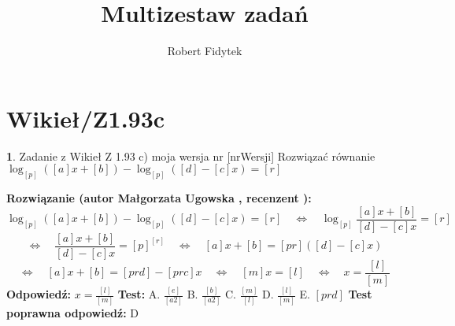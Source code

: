 \documentclass[12pt, a4paper]{article}
\title{Multizestaw zadań}
\author{Robert Fidytek}
\date{}
\theoremstyle{definition} %
\newtheorem{zad}{}
\newcommand{\kategoria}[1]{\section{#1}} %
\newcommand{\zadStart}[1]{\begin{zad}#1\newline} %
\newcommand{\zadStop}{\end{zad}}   %
\newcommand{\rozwStart}[2]{\noindent \textbf{Rozwiązanie (autor #1 , recenzent #2): }\newline} %
\newcommand{\rozwStop}{\newline}                                            %
\newcommand{\odpStart}{\noindent \textbf{Odpowiedź:}\newline}    %
\newcommand{\odpStop}{\newline}                                             %
\newcommand{\testStart}{\noindent \textbf{Test:}\newline} %
\newcommand{\testStop}{\newline} %
\newcommand{\kluczStart}{\noindent \textbf{Test poprawna odpowiedź:}\newline} %
\newcommand{\kluczStop}{\newline} %
\begin{document}
\maketitle


\kategoria{Wikieł/Z1.93c}
\zadStart{Zadanie z Wikieł Z 1.93 c) moja wersja nr [nrWersji]}
Rozwiązać równanie $\log_{[p]}{([a]x+[b])} - \log_{[p]}{([d]-[c]x)} = [r]$
\zadStop
\rozwStart{Małgorzata Ugowska}{}
$$\log_{[p]}{([a]x+[b])} - \log_{[p]}{([d]-[c]x)} = [r] \quad \Longleftrightarrow \quad \log_{[p]}{\frac{[a]x+[b]}{[d]-[c]x}}= [r]$$
$$\Longleftrightarrow \quad \frac{[a]x+[b]}{[d]-[c]x}=[p]^{[r]} \quad \Longleftrightarrow \quad  [a]x+[b]=[pr]([d]-[c]x)$$
$$\Longleftrightarrow \quad [a]x+[b]=[prd]-[prc]x \quad \Longleftrightarrow \quad [m]x=[l] \quad \Longleftrightarrow \quad x=\frac{[l]}{[m]}$$
\rozwStop
\odpStart
$x=\frac{[l]}{[m]}$
\odpStop
\testStart
A. $\frac{[e]}{[a2]}$
B. $\frac{[b]}{[a2]}$
C. $\frac{[m]}{[l]}$
D. $\frac{[l]}{[m]}$
E. $[prd]$
\testStop
\kluczStart
D
\kluczStop
\end{document}
